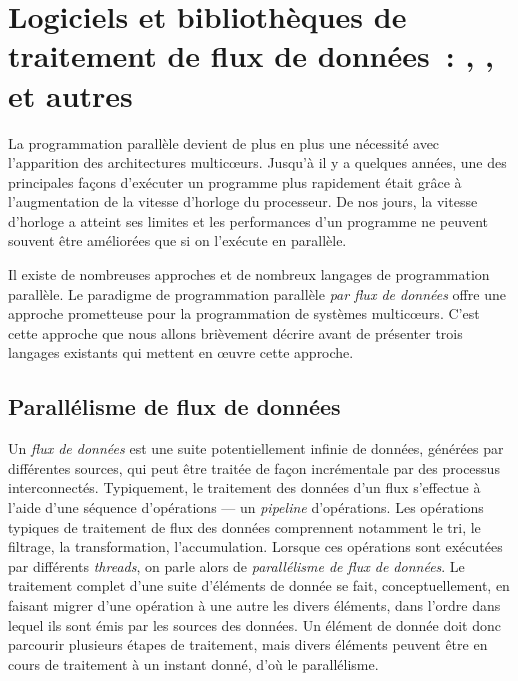 
\chapter{Logiciels et bibliothèques de traitement de flux de donn\'ees~: , ,  et autres}
\label{outils_connus}
\label{outils_connus.chap}


La programmation parall\`ele devient de plus en plus une n\'ecessit\'e avec l'apparition des architectures multicœurs. Jusqu'\`a il y a quelques ann\'ees, une des principales fa\c{c}ons d'ex\'ecuter un programme plus rapidement \'etait gr\^ace \`a l'augmentation de la vitesse d'horloge du processeur. De nos jours, la vitesse d'horloge a atteint ses limites et les performances d'un programme ne peuvent souvent \^etre am\'elior\'ees que si on l'ex\'ecute en parall\`ele. 

Il existe de nombreuses approches et de nombreux langages de programmation parall\`ele.
%
Le paradigme de programmation parall\`ele \emph{par flux de donn\'ees} offre une approche prometteuse pour la programmation de syst\`emes multicœurs. C'est cette approche que nous allons bri\`evement d\'ecrire avant de pr\'esenter trois langages existants qui mettent en \oe{}uvre cette approche.

\section{Parall\'elisme de flux de donn\'ees}


Un \emph{flux de donn\'ees} est une suite potentiellement infinie de donn\'ees, g\'en\'er\'ees par diff\'erentes sources, qui peut \^etre trait\'ee de fa\c{c}on incr\'ementale par des processus interconnect\'es. Typiquement, le traitement des donn\'ees d'un flux s'effectue \`a l'aide d'une s\'equence d'op\'erations --- un \emph{pipeline} d'op\'erations. Les op\'erations typiques de traitement de flux des donn\'ees comprennent notamment le tri, le filtrage,  la transformation, l'accumulation. Lorsque ces op\'erations sont ex\'ecut\'ees par diff\'erents \emph{threads}, on parle alors de \emph{parall\'elisme de flux de donn\'ees}. Le traitement complet d'une suite d'\'el\'ements de donn\'ee se fait, conceptuellement, en faisant migrer d'une op\'eration \`a une autre les divers \'el\'ements, dans l'ordre dans lequel ils sont \'emis par les sources des donn\'ees.
%
Un \'el\'ement de donn\'ee doit donc parcourir plusieurs \'etapes de traitement, mais divers \'el\'ements peuvent \^etre en cours de traitement \`a un instant donn\'e, d'o\`u le parall\'elisme.

